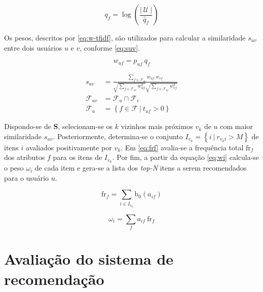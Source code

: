 \begin{equation}
\label{eq:iuf} 
    q_{f} = \log \left( \frac{\left|~\mathcal{U}~\right|}{\hat{q}_{f}} \right)
\end{equation} 

Os pesos, descritos por \ref{eq:w-tfidf}, são utilizados para calcular a similaridade $s_{uv}$ entre dois usuários $u$ e $v$, conforme \ref{eq:suv}.

\begin{equation}
\label{eq:w-tfidf} 
    w_{uf} = p_{uf}~q_{f}
\end{equation} 


\begin{equation}
\label{eq:suv}
\begin{split}
    s_{uv} &= \frac{\sum\limits_{f \in \mathcal{F}_{uv}}{w_{uf}~w_{vf}}}{\sqrt{\sum\limits_{f \in \mathcal{F}_{uv}
    }w_{uf}^2} \sqrt{\sum\limits_{f \in \mathcal{F}_{uv}}w_{vf}^2}} \\
    \mathcal{F}_{uv} &= \mathcal{F}_u \cap \mathcal{F}_v \\
    \mathcal{F}_u &= \left\{ f \in \mathcal{F}~|~t_{uf} > 0 \right\}
\end{split}    
\end{equation} 

Dispondo-se de $\mathbf{S}$, selecionam-se os $k$ vizinhos mais próximos $v_k$ de $u$ com maior similaridade $s_{uv}$.  Posteriormente, determina-se o conjunto $I_{v_k} = \left\{ i ~|~ r_{v_ki} > M\right\}$ de itens $i$ avaliados positivamente por $v_k$. Em \ref{eq:frf} avalia-se a frequência total $\mathrm{fr}_f$ dos atributos $f$ para os itens de $I_{v_k}$. Por fim, a partir da equação \ref{eq:wi} calcula-se o peso $\omega_i$ de cada item e gera-se a lista dos \textit{top-N} itens a serem recomendados para o usuário $u$. 


\begin{equation}
\label{eq:frf} 
\mathrm{fr}_f = \sum_{i \in I_{v_k}}{\mathrm{b}_0\left(a_{if}\right)}
\end{equation} 

\begin{equation}
\label{eq:wi} 
    \omega_{i} = \sum_{f}{a_{if}~\mathrm{fr}_f}
\end{equation} 



\section{Avaliação do sistema de recomendação} %
\label{sec:avalia_o_do_sistema_de_recomenda_o}

